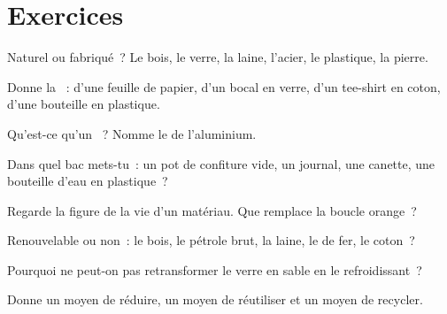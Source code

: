 \section{Exercices}

\begin{exercise}[$\star$]\label{exo:g5:raw-materials-and-recycling:1}
Naturel ou fabriqué~? Le bois, le verre, la laine, l'acier, le
plastique, la pierre.
\end{exercise}

\begin{exercise}[$\star$]\label{exo:g5:raw-materials-and-recycling:2}
Donne la ~: d'une feuille de papier, d'un bocal en
verre, d'un tee-shirt en coton, d'une bouteille en plastique.
\end{exercise}

\begin{exercise}[$\star$]\label{exo:g5:raw-materials-and-recycling:3}
Qu'est-ce qu'un ~? Nomme le  de l'aluminium.
\end{exercise}

\begin{exercise}[$\star$]\label{exo:g5:raw-materials-and-recycling:4}
Dans quel bac mets-tu~: un pot de confiture vide, un journal, une
canette, une bouteille d'eau en plastique~?
\end{exercise}

\begin{exercise}[$\star$]\label{exo:g5:raw-materials-and-recycling:5}
Regarde la figure de la vie d'un matériau. Que remplace la boucle
orange~?
\end{exercise}

\begin{exercise}[$\star$]\label{exo:g5:raw-materials-and-recycling:6}
Renouvelable ou non~: le bois, le pétrole brut, la laine, le  de
fer, le coton~?
\end{exercise}

\begin{exercise}[$\star$]\label{exo:g5:raw-materials-and-recycling:7}
Pourquoi ne peut-on pas retransformer le verre en sable en le
refroidissant~?
\end{exercise}

\begin{exercise}[$\star$]\label{exo:g5:raw-materials-and-recycling:8}
Donne un moyen de réduire, un moyen de réutiliser et un moyen de
recycler.
\end{exercise}

